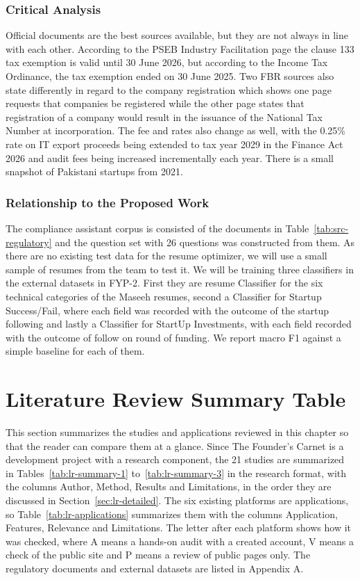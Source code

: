 \documentclass{FastFyp}
\begin{document}
\subsubsection{Critical Analysis}
Official documents are the best sources available, but they are not always in line with each other. According to the PSEB Industry Facilitation page the clause 133 tax exemption is valid until 30 June 2026, but according to the Income Tax Ordinance, the tax exemption ended on 30 June 2025. Two FBR sources also state differently in regard to the company registration which shows one page requests that companies be registered while the other page states that registration of a company would result in the issuance of the National Tax Number at incorporation. The fee and rates also change as well, with the 0.25\% rate on IT export proceeds being extended to tax year 2029 in the Finance Act 2026 and audit fees being increased incrementally each year. There is a small snapshot of Pakistani startups from 2021.

\subsubsection{Relationship to the Proposed Work}\label{sec:classifiers}
The compliance assistant corpus is consisted of the documents in Table~\ref{tab:src-regulatory} and the question set with 26 questions was constructed from them. As there are no existing test data for the resume optimizer, we will use a small sample of resumes from the team to test it. We will be training three classifiers in the external datasets in FYP-2. First they are resume Classifier for the six technical categories of the Maseeh resumes, second a Classifier for Startup Success/Fail, where each field was recorded with the outcome of the startup following and lastly a Classifier for StartUp Investments, with each field recorded with the outcome of follow on round of funding. We report macro F1 against a simple baseline for each of them.

\section{Literature Review Summary Table}\label{sec:lr-summary}
This section summarizes the studies and applications reviewed in this chapter so that the reader can compare them at a glance. Since The Founder's Carnet is a development project with a research component, the 21 studies are summarized in Tables~\ref{tab:lr-summary-1} to~\ref{tab:lr-summary-3} in the research format, with the columns Author, Method, Results and Limitations, in the order they are discussed in Section~\ref{sec:lr-detailed}. The six existing platforms are applications, so Table~\ref{tab:lr-applications} summarizes them with the columns Application, Features, Relevance and Limitations. The letter after each platform shows how it was checked, where A means a hands-on audit with a created account, V means a check of the public site and P means a review of public pages only. The regulatory documents and external datasets are listed in Appendix A.
\end{document}
